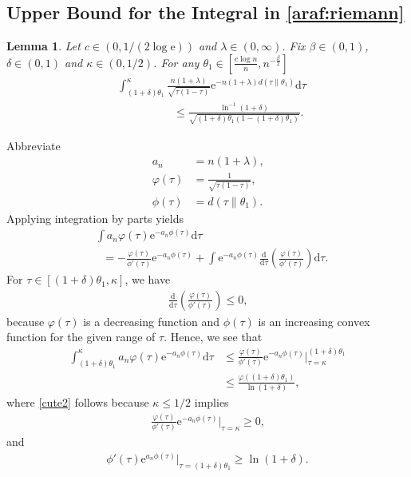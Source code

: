 \documentclass[journal, 10pt]{IEEEtran}
\newcommand{\rmd}{\mathrm{d}}
\newcommand{\rme}{\mathrm{e}}
\theoremstyle{plain}
\theoremstyle{plain}
\newtheorem{lem}{Lemma}%
\theoremstyle{plain}
\theoremstyle{plain}
\begin{document}
\begin{appendices}
\section{Upper Bound for the Integral in \eqref{araf:riemann}} \label{appdx:bound on integral}
\begin{lem}\label{lem:bound on integral}
Let $c\in (0,1/(2\log \rme)) $ and $\lambda\in (0,\infty) $. Fix $\beta\in(0,1) $, $\delta\in(0,1) $ and $\kappa\in(0,1/2) $. For any $\theta_1\in \left[ \frac{c\log n}{n}, n^{-\frac{\beta}{2}} \right] $
\begin{align}
	&\int_{(1+\delta)\theta_1}^{\kappa } \frac{n(1+\lambda)}{\sqrt{\tau(1-\tau)}}\rme^{-n(1+\lambda)d(\tau\|\theta_1)}\rmd \tau 
	\nonumber \\ &\qquad \qquad \quad \le \frac{\ln^{-1}(1+\delta)}{\sqrt{(1+\delta)\theta_1(1-(1+\delta)\theta_1)} }\text{.}
\end{align}
\end{lem}
\begin{IEEEproof}
Abbreviate 
\begin{align}
	a_n&=n(1+\lambda)\text{,} \\
	\varphi(\tau)&=\frac{1}{\sqrt{\tau(1-\tau)}}\text{,} \\ 
	\phi(\tau) &= d(\tau\|\theta_1)\text{.}
\end{align}
Applying integration by parts yields
\begin{align}
	&\int  a_n \varphi(\tau)\rme^{-a_n\phi(\tau)}\rmd \tau \nonumber \\
	&\ \ \, = -\frac{\varphi(\tau)}{\phi'(\tau)}\rme^{-a_n\phi(\tau)}+ \int \rme^{-a_n\phi(\tau)} \frac{\rmd}{\rmd \tau} \left(\frac{\varphi(\tau)}{\phi'(\tau)} \right) \rmd \tau \text{.} 
\end{align}
For $\tau \in \left[(1+\delta)\theta_1, \kappa \right] $, we have
\begin{align}
	\frac{\rmd}{\rmd \tau}\left(\frac{\varphi(\tau)}{\phi'(\tau)}\right) \le 0\text{,}
\end{align}
because $\varphi(\tau)$ is a decreasing function and $\phi(\tau) $ is an increasing convex function for the given range of $\tau $. Hence, we see that
\begin{align}
\int_{(1+\delta)\theta_1}^{\kappa}  a_n \varphi(\tau)\rme^{-a_n\phi(\tau)}\rmd \tau &\le 
\frac{\varphi(\tau)}{\phi'(\tau)}\rme^{-a_n\phi(\tau)}\bigg|_{\tau=\kappa}^{(1+\delta)\theta_1}\\
& \le 
\frac{\varphi((1+\delta)\theta_1)}{\ln(1+\delta) } \label{cute2}\text{,}
\end{align}
where \eqref{cute2} follows because $\kappa\le 1/2 $ implies
\begin{align}
	\frac{\varphi(\tau)}{\phi'(\tau)}\rme^{-a_n\phi(\tau)}\bigg|_{\tau=\kappa} \ge 0\text{,}
\end{align}
and
\begin{align}
\phi'(\tau)\rme^{a_n\phi(\tau)}\bigg|_{\tau=(1+\delta)\theta_1} \ge \ln (1+\delta)\text{.}
\end{align}	
\end{IEEEproof}

\end{appendices}
\end{document}

